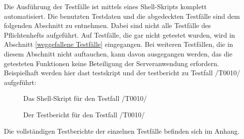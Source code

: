 \documentclass[11pt,a4paper]{scrartcl}
\begin{document}
Die Ausführung der Testfälle ist mittels eines Shell-Skripts komplett automatisiert. Die benutzten Testdaten und die abgedeckten Testfälle sind dem folgenden Abschnitt zu entnehmen. Dabei sind nicht alle Testfälle des Pflichtenhefts aufgeführt. Auf Testfälle, die gar nicht getestet wurden, wird in Abschnitt \ref{weggefallene Testfälle} eingegangen. Bei weiteren Testfällen, die in diesem Abschnitt nicht auftauchen, kann davon ausgegangen werden, das die getesteten Funktionen keine Beteiligung der Serveranwendung erfordern.\\

Beispielhaft werden hier dast testskript und der testbericht zu Testfall /T0010/ aufgeführt:

\begin{figure}[H]
\caption{Das Shell-Skript für den Testfall /T0010/}
\end{figure}

\begin{figure}[H]
\caption{Der Testbericht für den Testfall /T0010/}
\end{figure}

Die vollständigen Testberichte der einzelnen Testfälle befinden sich im Anhang.

\newpage
\end{document}
